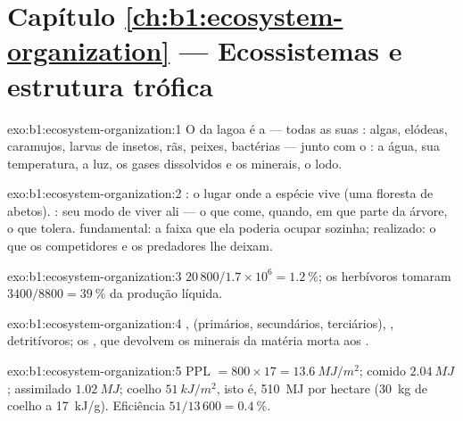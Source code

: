 \section*{Capítulo \ref{ch:b1:ecosystem-organization} --- Ecossistemas e estrutura trófica}

\begin{solution}{exo:b1:ecosystem-organization:1}
O  da lagoa é a  --- todas as suas :
algas, elódeas, caramujos, larvas de insetos, rãs, peixes, bactérias
--- junto com o : a água, sua temperatura, a luz, os gases
dissolvidos e os minerais, o lodo.
\end{solution}

\begin{solution}{exo:b1:ecosystem-organization:2}
: o lugar onde a espécie vive (uma floresta de abetos). :
seu modo de viver ali --- o que come, quando, em que parte da árvore,
o que tolera.  fundamental: a faixa que ela poderia ocupar
sozinha; realizado: o que os competidores e os predadores lhe deixam.
\end{solution}

\begin{solution}{exo:b1:ecosystem-organization:3}
$20\,800/1.7\times 10^6 = \qty{1.2}{\%}$; os herbívoros tomaram
$3400/8800 = \qty{39}{\%}$ da produção líquida.
\end{solution}

\begin{solution}{exo:b1:ecosystem-organization:4}
,  (primários, secundários, terciários),
, detritívoros; os , que devolvem os
minerais da matéria morta aos .
\end{solution}

\begin{solution}{exo:b1:ecosystem-organization:5}
PPL $= 800\times 17 = \qty{13.6}{MJ/m^2}$; comido $\qty{2.04}{MJ}$;
assimilado $\qty{1.02}{MJ}$; coelho $\qty{51}{kJ/m^2}$, isto é,
\qty{510}{MJ} por hectare (\qty{30}{kg} de coelho a \qty{17}{kJ/g}).
Eficiência $51/13\,600 = \qty{0.4}{\%}$.
\end{solution}

